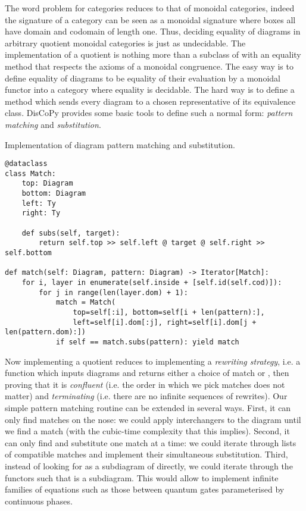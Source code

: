 The word problem for categories reduces to that of monoidal categories, indeed the signature of a category can be seen as a monoidal signature where boxes all have domain and codomain of length one.
Thus, deciding equality of diagrams in arbitrary quotient monoidal categories is just as undecidable.
The implementation of a quotient is nothing more than a subclass of  with an equality method that respects the axioms of a monoidal congruence.
The easy way is to define equality of diagrams to be equality of their evaluation by a monoidal functor into a category where equality is decidable.
The hard way is to define a  method which sends every diagram to a chosen representative of its equivalence class.
DisCoPy provides some basic tools to define such a normal form: \emph{pattern matching} and \emph{substitution}.

\begin{python}
{\normalfont Implementation of diagram pattern matching and substitution.}

\begin{verbatim}
@dataclass
class Match:
    top: Diagram
    bottom: Diagram
    left: Ty
    right: Ty

    def subs(self, target):
        return self.top >> self.left @ target @ self.right >> self.bottom

def match(self: Diagram, pattern: Diagram) -> Iterator[Match]:
    for i, layer in enumerate(self.inside + [self.id(self.cod)]):
        for j in range(len(layer.dom) + 1):
            match = Match(
                top=self[:i], bottom=self[i + len(pattern):],
                left=self[i].dom[:j], right=self[i].dom[j + len(pattern.dom):])
            if self == match.subs(pattern): yield match
\end{verbatim}
\end{python}

Now implementing a quotient reduces to implementing a \emph{rewriting strategy}, i.e. a function which inputs diagrams and returns either a choice of match or , then proving that it is \emph{confluent} (i.e. the order in which we pick matches does not matter) and \emph{terminating} (i.e. there are no infinite sequences of rewrites).
Our simple pattern matching routine can be extended in several ways.
First, it can only find matches on the nose: we could apply interchangers to the diagram until we find a match (with the cubic-time complexity that this implies).
Second, it can only find and substitute one match at a time: we could iterate through lists of compatible matches and implement their simultaneous substitution.
Third, instead of looking for  as a subdiagram of  directly, we could iterate through the functors  such that  is a subdiagram.
This would allow to implement infinite families of equations such as those between quantum gates parameterised by continuous phases.

